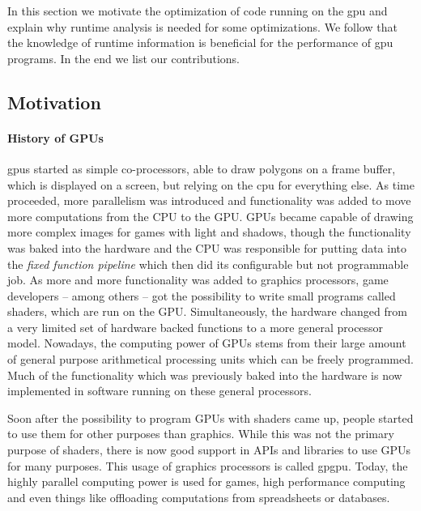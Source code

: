 {}
In this section we motivate the optimization of code running on the \gls{gpu} and explain why runtime analysis is needed for some optimizations. We follow that the knowledge of runtime information is beneficial for the performance of \gls{gpu} programs. In the end we list our contributions.

\subsection{Motivation}
\label{sub:motivation}
\paragraph{History of GPUs} \Glspl{gpu} started as simple co-processors, able to draw polygons on a frame buffer, which is displayed on a screen, but relying on the \gls{cpu} for everything else. As time proceeded, more parallelism was introduced and functionality was added to move more computations from the CPU to the GPU. GPUs became capable of drawing more complex images for games with light and shadows, though the functionality was baked into the hardware and the CPU was responsible for putting data into the \emph{fixed function pipeline} which then did its configurable but not programmable job.
As more and more functionality was added to graphics processors, game developers -- among others -- got the possibility to write small programs called shaders, which are run on the GPU. Simultaneously, the hardware changed from a very limited set of hardware backed functions to a more general processor model. Nowadays, the computing power of GPUs stems from their large amount of general purpose arithmetical processing units which can be freely programmed. Much of the functionality which was previously baked into the hardware is now implemented in software running on these general processors.~\cite{McClanahan2010}

Soon after the possibility to program GPUs with shaders came up, people started to use them for other purposes than graphics. While this was not the primary purpose of shaders, there is now good support in APIs and libraries to use GPUs for many purposes. This usage of graphics processors is called \gls{gpgpu}. Today, the highly parallel computing power is used for games, high performance computing and even things like offloading computations from spreadsheets or databases.~\cite{Lillqvist2016, Meraji2015}

